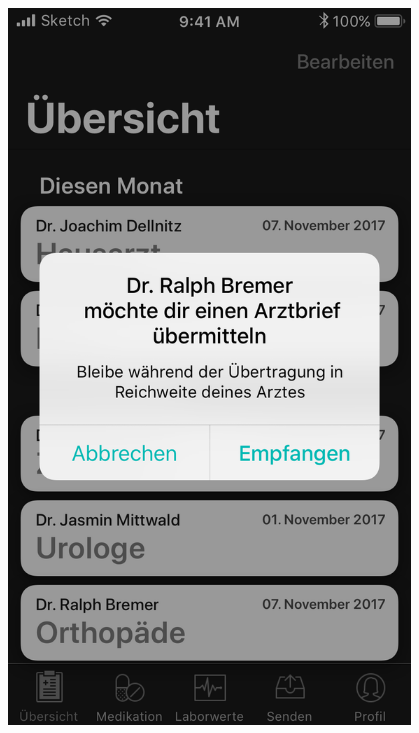 \documentclass[a4paper]{scrreprt}
\begin{document}
\newpage


\begin{minipage}[t][][b]{0.45\textwidth}

\includegraphics[width=0.8\textwidth]{mockups/ReceiveData}
\begin{flushleft}
\end{flushleft}



\end{minipage}
\end{document}
